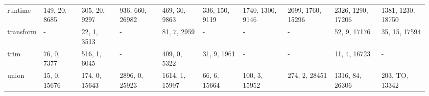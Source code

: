 \begin{tabular}{llllllllll}
 runtime        & 149, 20, 8685  & 305, 20, 9297 & 936, 660, 26982 & 469, 30, 9863  & 336, 150, 9119 & 1740, 1300, 9146 & 2099, 1760, 15296 & 2326, 1290, 17206 & 1381, 1230, 18750 \\
 transform      & -              & 22, 1, 3513   & -               & 81, 7, 2959    & -              & -                & -                 & 52, 9, 17176      & 35, 15, 17594     \\
 trim           & 76, 0, 7377    & 516, 1, 6045  & -               & 409, 0, 5322   & 31, 9, 1961    & -                & -                 & 11, 4, 16723      & -                 \\
 union          & 15, 0, 15676   & 174, 0, 15643 & 2896, 0, 25923  & 1614, 1, 15997 & 66, 6, 15664   & 100, 3, 15952    & 274, 2, 28451     & 1316, 84, 26306   & 203, TO, 13342    \\
\hline
\end{tabular}